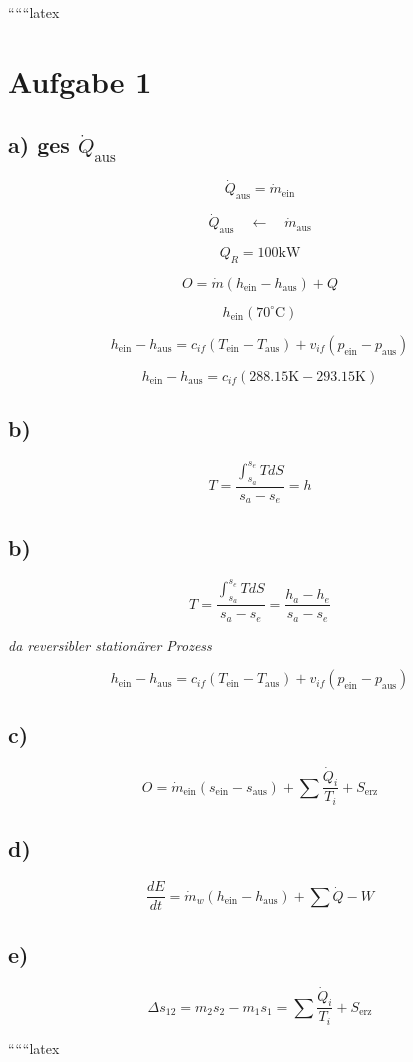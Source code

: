 
``````latex


\section*{Aufgabe 1}

\subsection*{a) ges $\dot{Q}_{\text{aus}}$}

\[
\dot{Q}_{\text{aus}} = \dot{m}_{\text{ein}}
\]

\[
\dot{Q}_{\text{aus}} \quad \longleftarrow \quad \dot{m}_{\text{aus}}
\]

\[
Q_R = 100 \text{kW}
\]

\[
O = \dot{m} (h_{\text{ein}} - h_{\text{aus}}) + Q
\]

\[
h_{\text{ein}} (70^\circ \text{C})
\]

\[
h_{\text{ein}} - h_{\text{aus}} = c_{if} (T_{\text{ein}} - T_{\text{aus}}) + v_{if} (p_{\text{ein}} - p_{\text{aus}})
\]

\[
h_{\text{ein}} - h_{\text{aus}} = c_{if} (288.15 \text{K} - 293.15 \text{K})
\]

\subsection*{b)}

\[
T = \frac{\int_{s_a}^{s_e} T dS}{s_a - s_e} = h
\]

\subsection*{b)}

\[
T = \frac{\int_{s_a}^{s_e} T dS}{s_a - s_e} = \frac{h_a - h_e}{s_a - s_e}
\]

\textit{da reversibler stationärer Prozess}

\[
h_{\text{ein}} - h_{\text{aus}} = c_{if} (T_{\text{ein}} - T_{\text{aus}}) + v_{if} (p_{\text{ein}} - p_{\text{aus}})
\]

\subsection*{c)}

\[
O = \dot{m}_{\text{ein}} (s_{\text{ein}} - s_{\text{aus}}) + \sum \frac{\dot{Q}_i}{T_i} + S_{\text{erz}}
\]

\subsection*{d)}

\[
\frac{dE}{dt} = \dot{m}_w (h_{\text{ein}} - h_{\text{aus}}) + \sum \dot{Q} - W
\]

\subsection*{e)}

\[
\Delta s_{12} = m_2 s_2 - m_1 s_1 = \sum \frac{\dot{Q}_i}{T_i} + S_{\text{erz}}
\]

``````latex


